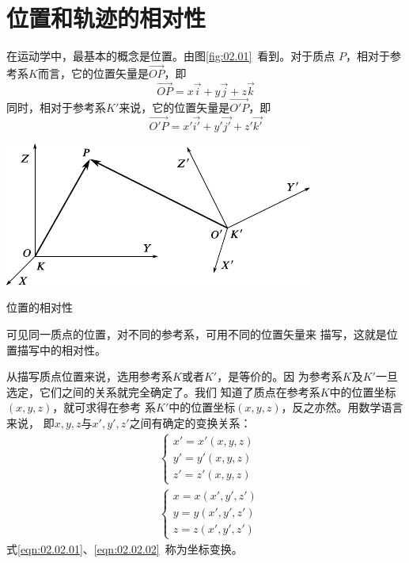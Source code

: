 \section{位置和轨迹的相对性}\label{sec:02.02}

在运动学中，最基本的概念是位置。由图\ref{fig:02.01}~看到。对于质点
$P$，相对于参考系$K$而言，它的位置矢量是$\vec{OP}$，即
\begin{equation*}
  \vec{OP}=x\vec{i}+y\vec{j}+z\vec{k}
\end{equation*}
同时，相对于参考系$K'$来说，它的位置矢量是$\vec{O'P}$，即
\begin{equation*}
  \vec{O'P}=x'\vec{i'}+y'\vec{j'}+z'\vec{k'}
\end{equation*}
\begin{figurex}
  \centering
  \includegraphics{figure/fig02.01}
  \caption{位置的相对性}
  \label{fig:02.01}
\end{figurex}

\clearpage
可见同一质点的位置，对不同的参考系，可用不同的位置矢量来
描写，这就是位置描写中的相对性。

从描写质点位置来说，选用参考系$ K $或者$ K' $，是等价的。因
为参考系$K$及$K'$一旦选定，它们之间的关系就完全确定了。我们
知道了质点在参考系$K$中的位置坐标$\left(x,y,z\right)$，就可求得在参考
系$K'$中的位置坐标$\left(x,y,z\right)$，反之亦然。用数学语言来说，
即$x,y,z$与$x',y',z'$之间有确定的变换关系：
\begin{align}
  \label{eqn:02.02.01}
   & \left\{\begin{array}{l}
              x'=x'\left(x, y, z\right) \\
              y'=y'\left(x, y, z\right) \\
              z'=z'\left(x, y, z\right)
            \end{array}\right.  \\
  \label{eqn:02.02.02}
   & \left\{\begin{array}{l}
              x=x\left(x', y', z'\right) \\
              y=y\left(x', y', z'\right) \\
              z=z\left(x', y', z'\right)
            \end{array}\right.
\end{align}
式\eqref{eqn:02.02.01}、\eqref{eqn:02.02.02}~称为坐标变换。

